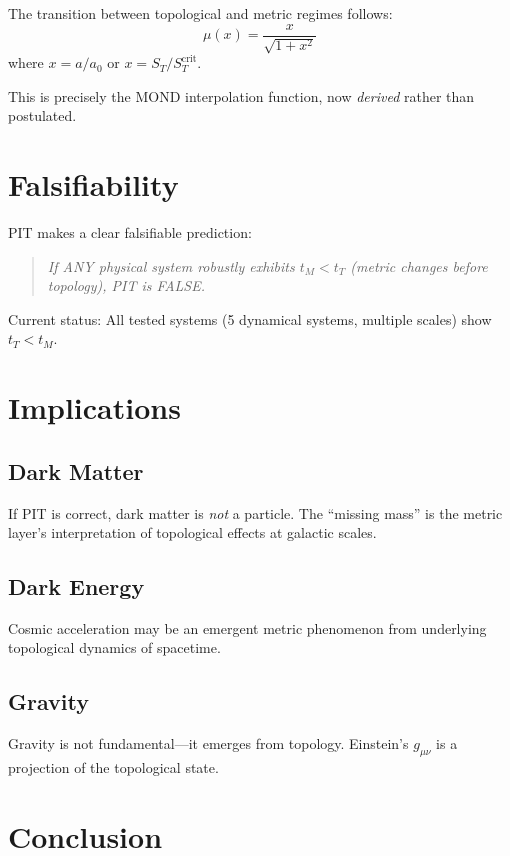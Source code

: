 \documentclass[aps,pre,twocolumn,superscriptaddress]{revtex4-2}
\begin{document}
The transition between topological and metric regimes follows:
\begin{equation}
\mu(x) = \frac{x}{\sqrt{1 + x^2}}
\end{equation}
where $x = a/a_0$ or $x = S_T/S_T^{\text{crit}}$.

This is precisely the MOND interpolation function, now \textit{derived} rather than postulated.

\section{Falsifiability}

PIT makes a clear falsifiable prediction:

\begin{quote}
\textit{If ANY physical system robustly exhibits $t_M < t_T$ (metric changes before topology), PIT is FALSE.}
\end{quote}

Current status: All tested systems (5 dynamical systems, multiple scales) show $t_T < t_M$.

\section{Implications}

\subsection{Dark Matter}

If PIT is correct, dark matter is \textit{not} a particle. The ``missing mass'' is the metric layer's interpretation of topological effects at galactic scales.

\subsection{Dark Energy}

Cosmic acceleration may be an emergent metric phenomenon from underlying topological dynamics of spacetime.

\subsection{Gravity}

Gravity is not fundamental---it emerges from topology. Einstein's $g_{\mu\nu}$ is a projection of the topological state.

\section{Conclusion}
\end{document}
